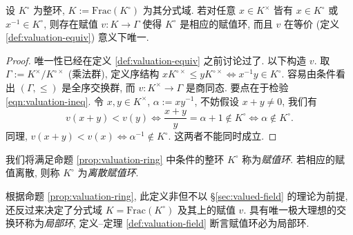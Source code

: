 \begin{proposition}\label{prop:valuation-ring}
	设 $K^\circ$ 为整环, $K := \mathrm{Frac}(K^\circ)$ 为其分式域. 若对任意 $x \in K^\times$ 皆有 $x \in K^\circ$ 或 $x^{-1} \in K^\circ$, 则存在赋值 $v: K \to \Gamma$ 使得 $K^\circ$ 是相应的赋值环, 而且 $v$ 在等价 (定义 \ref{def:valuation-equiv}) 意义下唯一.
\end{proposition}
\begin{proof}
	唯一性已经在定义 \ref{def:valuation-equiv} 之前讨论过了. 以下构造 $v$. 取 $\Gamma := K^\times/K^{\circ\times}$ (乘法群), 定义序结构 $x K^{\circ\times} \leq y K^{\circ\times} \iff x^{-1}y \in K^\circ$. 容易由条件看出 $(\Gamma, \leq)$ 是全序交换群, 而 $v: K^\times \to \Gamma$ 是商同态. 要点在于检验 \eqref{eqn:valuation-ineq}. 令 $x,y \in K^\times$, $\alpha := xy^{-1}$, 不妨假设 $x+y \neq 0$, 我们有
	\[ v(x+y) < v(y) \iff \frac{x+y}{y} = \alpha + 1 \notin K^\circ \iff \alpha \notin K^\circ. \]
	同理, $v(x+y) < v(x) \iff \alpha^{-1} \notin K^\circ$. 这两者不能同时成立.
\end{proof}

\begin{definition}\label{def:valuation-ring}
	我们将满足命题 \ref{prop:valuation-ring} 中条件的整环 $K^\circ$ 称为\emph{赋值环}. 若相应的赋值离散, 则称 $K^\circ$ 为\emph{离散赋值环}. 
\end{definition}
根据命题 \ref{prop:valuation-ring}, 此定义非但不以 \S\ref{sec:valued-field} 的理论为前提, 还反过来决定了分式域 $K = \text{Frac}(K^\circ)$ 及其上的赋值 $v$. 具有唯一极大理想的交换环称为\emph{局部环}, 定义--定理 \ref{def:valuation-field} 断言赋值环必为局部环. 

